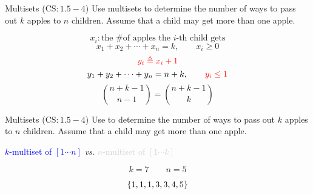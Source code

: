 
\begin{frame}{}
  \begin{exampleblock}{Multisets ($\text{CS}: 1.5-4$)}
    Use multisets to determine the number of ways to pass out $k$  apples to $n$ children. 
    Assume that a child may get more than one apple.
  \end{exampleblock}

  \pause
  \[
    x_i: \text{the \# of apples the $i$-th child gets}
  \]
  \[
    x_1 + x_2 + \cdots + x_n = k, \qquad x_i \ge 0
  \]
  \pause
  \[
    \textcolor{red}{y_i \triangleq x_i + 1}
  \]
  \pause
  \[
    y_1 + y_2 + \cdots + y_n = n + k, \qquad \textcolor{red}{y_i \le 1}
  \]
  \pause 
  \[
    \binom{n+k-1}{n-1} = \binom{n+k-1}{k}
  \]
\end{frame}

\begin{frame}{}
  \begin{exampleblock}{Multisets ($\text{CS}: 1.5-4$)}
    Use  to determine the number of ways to pass out $k$  apples to $n$ children. 
    Assume that a child may get more than one apple.
  \end{exampleblock}

  \pause
  \vspace{0.30cm}
  \centerline{ \textcolor<6->{blue}{$k$-multiset of $[1 \cdots n]$} \emph{vs.} \textcolor<6->{lightgray}{$n$-multiset of $[1 \cdots k]$}}

  \pause
  \[
    k = 7 \qquad n = 5
  \]

  \pause

  \pause
  \vspace{-0.80cm}
  \[
    \{1,1,1,3,3,4,5\}
  \]
\end{frame}
